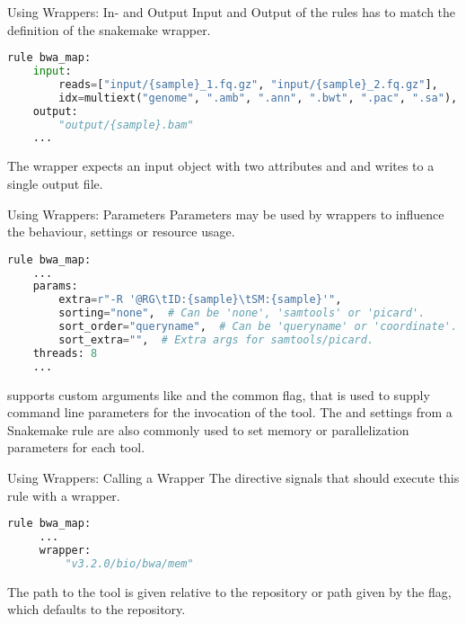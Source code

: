 \begin{frame}[fragile]{Using Wrappers: In- and Output}
    Input and Output of the rules has to match the definition of the snakemake wrapper.
    \begin{lstlisting}[language=Python,style=Python]
rule bwa_map:
    input:
        reads=["input/{sample}_1.fq.gz", "input/{sample}_2.fq.gz"],
        idx=multiext("genome", ".amb", ".ann", ".bwt", ".pac", ".sa"),
    output:
        "output/{sample}.bam"
    ...
    \end{lstlisting}
    \begin{docs}
        The  wrapper expects an input object with two attributes
         and  and writes to a single output file.
    \end{docs}
\end{frame}

\begin{frame}[fragile]{Using Wrappers: Parameters}
    Parameters may be used by wrappers to influence the behaviour, settings or resource usage.
    \begin{lstlisting}[language=Python,style=Python]
rule bwa_map:
    ...
    params:
        extra=r"-R '@RG\tID:{sample}\tSM:{sample}'",
        sorting="none",  # Can be 'none', 'samtools' or 'picard'.
        sort_order="queryname",  # Can be 'queryname' or 'coordinate'.
        sort_extra="",  # Extra args for samtools/picard.
    threads: 8
    ...
    \end{lstlisting}
    \begin{docs}
         supports custom arguments like  and
        the common  flag, that is used to supply command line parameters
        for the invocation of the tool. The  and 
        settings from a Snakemake rule are also commonly used to set memory or parallelization
        parameters for each tool.
    \end{docs}
\end{frame}

 \begin{frame}[fragile]{Using Wrappers: Calling a Wrapper}
     The  directive signals that \Snakemake{} should execute this rule with
     a wrapper.
     \begin{lstlisting}[language=Python,style=Python]
 rule bwa_map:
     ...
     wrapper:
         "v3.2.0/bio/bwa/mem"
     \end{lstlisting}
     \begin{docs}
         The path to the tool is given relative to the repository or path given by the 
         flag, which defaults to the  repository.
     \end{docs}
 \end{frame}
 
